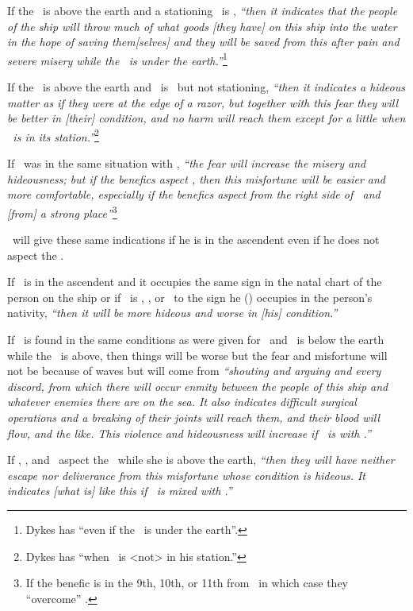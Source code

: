 If the \Moon\, is above the earth and a stationing \Saturn\, is \Trine, \textsl{``then it indicates that the people of the ship will throw much of what goods [they have] on this ship into the water in the hope of saving them[selves] and they will be saved from this after pain and severe misery while the \Moon\, is under the earth.''}\footnote{Dykes has ``even if the \Moon\, is under the earth''.}

If the \Moon\, is above the earth and \Saturn\, is \Trine\, but not stationing, \textsl{``then it indicates a hideous matter as if they were at the edge of a razor, but together with this fear they will be better in [their] condition, and no harm will reach them except for a little when \Saturn\, is in its station.''}\footnote{Dykes has ``when \Saturn\, is <not> in his station.''}

If \Saturn\, was in the same situation with \Mercury, \textsl{``the fear will increase the misery and hideousness; but if the benefics aspect \Saturn, then this misfortune will be easier and more comfortable, especially if the benefics aspect from the right side of \Saturn\, and [from] a strong place''}\footnote{If the benefic is in the 9th, 10th, or 11th from \Saturn\, in which case they ``overcome'' \Saturn.}

\Saturn\, will give these same indications if he is in the ascendent even if he does not aspect the \Moon.

If \Saturn\, is in the ascendent and it occupies the same sign in the natal chart of the person on the ship or if \Saturn\, is \Trine, \Square, or \Opposition\, to the sign he (\Saturn) occupies in the person's nativity, \textsl{``then it will be more hideous and worse in [his] condition.''}

If \Mars\, is found in the same conditions as were given for \Saturn\, and \Mars\, is below the earth while the \Moon\, is above, then things will be worse but the fear and misfortune will not be because of waves but will come from \textsl{``shouting and arguing and every discord, from which there will occur enmity between the people of this ship and whatever enemies there are on the sea. It also indicates difficult surgical operations and a breaking of their joints will reach them, and their blood will flow, and the like. This violence and hideousness will increase if \Mercury\, is with \Mars.''}

If \Saturn, \Mars, and \Mercury\, aspect the \Moon\, while she is above the earth, \textsl{``then they will have neither escape nor deliverance from this misfortune whose condition is hideous. It indicates [what is] like this if \Mars\, is mixed with \Mercury.''}

